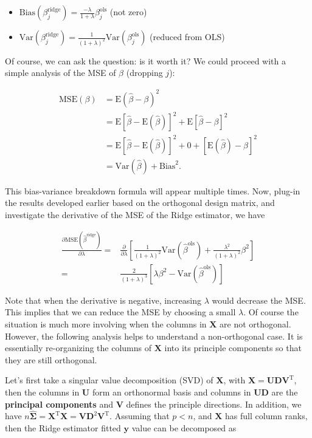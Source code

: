 \documentclass[
]{book}
\providecommand{\tightlist}{%
  \setlength{\itemsep}{0pt}\setlength{\parskip}{0pt}}
\theoremstyle{definition}
\theoremstyle{definition}
\theoremstyle{definition}
\theoremstyle{definition}
\theoremstyle{remark}
\begin{document}
\begin{itemize}
\tightlist
\item
  \(\text{Bias}(\beta_j^{\text{ridge}}) = \frac{-\lambda}{1 + \lambda} \beta_j^\text{ols}\) (not zero)
\item
  \(\text{Var}(\beta_j^{\text{ridge}}) = \frac{1}{(1 + \lambda)^2} \text{Var}(\beta_j^\text{ols})\) (reduced from OLS)
\end{itemize}

Of course, we can ask the question: is it worth it? We could proceed with a simple analysis of the MSE of \(\beta\) (dropping \(j\)):

\begin{align}
\text{MSE}(\beta) &= \text{E}(\widehat{\beta} - \beta)^2 \\
&= \text{E}[\widehat{\beta} - \text{E}(\widehat{\beta})]^2 + \text{E}[\widehat{\beta} - \beta]^2 \\
&= \text{E}[\widehat{\beta} - \text{E}(\widehat{\beta})]^2 + 0 + [\text{E}(\widehat{\beta}) - \beta]^2 \\
&= \text{Var}(\widehat{\beta}) + \text{Bias}^2.
\end{align}

This bias-variance breakdown formula will appear multiple times. Now, plug-in the results developed earlier based on the orthogonal design matrix, and investigate the derivative of the MSE of the Ridge estimator, we have

\begin{align}
\frac{\partial \text{MSE}(\widehat{\beta}^\text{ridge})}{ \partial \lambda} =& \frac{\partial}{\partial \lambda} \left[ \frac{1}{(1+\lambda)^2} \text{Var}(\widehat{\beta}^\text{ols}) + \frac{\lambda^2}{(1 + \lambda)^2} \beta^2 \right] \\
=& \frac{2}{(1+\lambda)^3} \left[ \lambda \beta^2 - \text{Var}(\widehat{\beta}^\text{ols}) \right]
\end{align}

Note that when the derivative is negative, increasing \(\lambda\) would decrease the MSE. This implies that we can reduce the MSE by choosing a small \(\lambda\). Of course the situation is much more involving when the columns in \(\mathbf{X}\) are not orthogonal. However, the following analysis helps to understand a non-orthogonal case. It is essentially re-organizing the columns of \(\mathbf{X}\) into its principle components so that they are still orthogonal.

Let's first take a singular value decomposition (SVD) of \(\mathbf{X}\), with \(\mathbf{X}= \mathbf{U}\mathbf{D}\mathbf{V}^\text{T}\), then the columns in \(\mathbf{U}\) form an orthonormal basis and columns in \(\mathbf{U}\mathbf{D}\) are the \textbf{principal components} and \(\mathbf{V}\) defines the principle directions. In addition, we have \(n \widehat{\boldsymbol \Sigma} = \mathbf{X}^\text{T}\mathbf{X}= \mathbf{V}\mathbf{D}^2 \mathbf{V}^\text{T}\). Assuming that \(p < n\), and \(\mathbf{X}\) has full column ranks, then the Ridge estimator fitted \(\mathbf{y}\) value can be decomposed as
\end{document}
